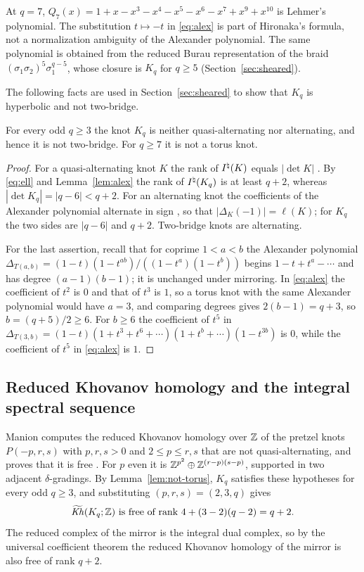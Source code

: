 \begin{remark}\label{rem:lehmer}
At $q=7$, $Q_7(x)=1+x-x^3-x^4-x^5-x^6-x^7+x^9+x^{10}$ is Lehmer's polynomial. The substitution
$t\mapsto-t$ in \eqref{eq:alex} is part of Hironaka's formula, not a normalization ambiguity of the
Alexander polynomial. The same polynomial is obtained from the reduced Burau representation of the
braid $(\sigma_1\sigma_2)^5\sigma_1^{q-5}$, whose closure is $K_q$ for $q\ge5$ (Section~\ref{sec:sheared}).
\end{remark}

The following facts are used in Section~\ref{sec:sheared} to show that $K_q$ is hyperbolic and not
two-bridge.

\begin{lemma}\label{lem:not-torus}
For every odd $q\ge3$ the knot $K_q$ is neither quasi-alternating nor alternating, and hence it is not
two-bridge. For $q\ge7$ it is not a torus knot.
\end{lemma}

\begin{proof}
For a quasi-alternating knot $K$ the rank of $I^{\natural}(K)$ equals $|\det K|$ \cite[Cor.~1.6]{KM2}. By
\eqref{eq:ell} and Lemma~\ref{lem:alex} the rank of $I^{\natural}(K_q)$ is at least $q+2$, whereas
$|\det K_q|=|q-6|<q+2$. For an alternating knot the coefficients of the Alexander polynomial
alternate in sign \cite{Crowell,MurasugiGenus}, so that $|\Delta_K(-1)|=\ell(K)$; for $K_q$ the two
sides are $|q-6|$ and $q+2$. Two-bridge knots are alternating.

For the last assertion, recall that for coprime $1<a<b$ the Alexander polynomial
$\Delta_{T(a,b)}=(1-t)(1-t^{ab})/((1-t^a)(1-t^b))$ begins $1-t+t^a-\cdots$ and has degree $(a-1)(b-1)$;
it is unchanged under mirroring. In \eqref{eq:alex} the coefficient of $t^2$ is $0$ and that of $t^3$
is $1$, so a torus knot with the same Alexander polynomial would have $a=3$, and comparing degrees
gives $2(b-1)=q+3$, so $b=(q+5)/2\ge6$. For $b\ge6$ the coefficient of $t^5$ in
$\Delta_{T(3,b)}=(1-t)(1+t^3+t^6+\cdots)(1+t^b+\cdots)(1-t^{3b})$ is $0$, while the coefficient of
$t^5$ in \eqref{eq:alex} is $1$.
\end{proof}

\subsection{Reduced Khovanov homology and the integral spectral sequence}\label{ss:kh-ss}
Manion computes the reduced Khovanov homology over $\mathbb{Z}$ of the pretzel knots $P(-p,r,s)$ with
$p,r,s>0$ and $2\le p\le r,s$ that are not quasi-alternating, and proves that it is free
\cite[Thm.~1.1 and Thm.~3.3]{Manion}. For $p$ even it is $\mathbb{Z}^{p^2}\oplus\mathbb{Z}^{(r-p)(s-p)}$, supported
in two adjacent $\delta$-gradings. By Lemma~\ref{lem:not-torus}, $K_q$ satisfies these hypotheses for
every odd $q\ge3$, and substituting $(p,r,s)=(2,3,q)$ gives
\begin{equation}\label{eq:kh-rank}
 \widetilde{\mathit{Kh}}(K_q;\mathbb{Z})\ \text{is free of rank}\ 4+(3-2)(q-2)=q+2 .
\end{equation}
The reduced complex of the mirror is the integral dual complex, so by the universal
coefficient theorem the reduced Khovanov homology of the mirror is also free of rank $q+2$.

